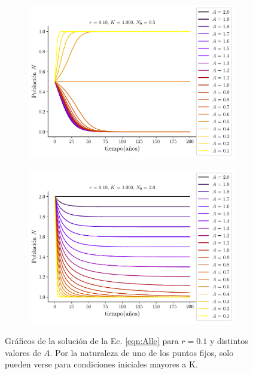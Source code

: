\documentclass[twocolumn,aps,prl]{revtex4-1}
\begin{document}
\begin{figure}[ht!]
    \centering
    \begin{subfigure}[b]{0.495\linewidth}
        \centering
        \includegraphics[width = 0.999\textwidth]{scripts/plots/ex6-y0chico02.pdf}
        \caption{}
        \label{fig:scripts/plots/ex6-y0chico02}
    \end{subfigure}
    \begin{subfigure}[b]{0.495\linewidth}
        \centering
        \includegraphics[width = 0.999\textwidth]{scripts/plots/ex6-y0grande02.pdf}
        \caption{}
        \label{fig:scripts/plots/ex6-y0grande02}
    \end{subfigure}
    \caption{Gráficos de la solución de la Ec. \ref{eqn:Alle} para $r=0.1$ y distintos valores de $A$. Por la naturaleza de uno de los puntos fijos, solo pueden verse para condiciones iniciales mayores a K.}
\end{figure}


\end{document}

